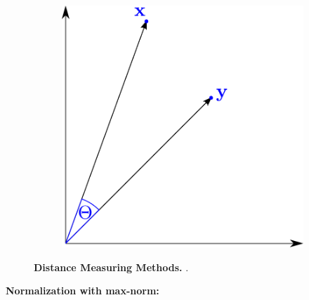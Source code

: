 \begin{figure}
\begin{subfigure}[b]{0.475\textwidth}
        \includegraphics[width=\textwidth]{Graphics/Cosinus.pdf}
    \end{subfigure}
    \caption[Distance Measuring Methods]{\textbf{Distance Measuring Methods.} .}
    \label{fig:Distance}
\end{figure}

\blindtext


\textbf{Normalization with max-norm:} 

